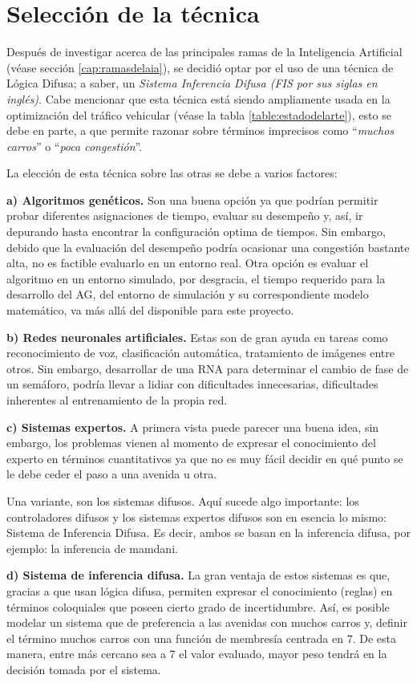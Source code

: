 \section{Selección de la técnica}\label{section:selecciontecnica}
Después de investigar acerca de las principales ramas de la Inteligencia Artificial (véase sección \ref{cap:ramasdelaia}), se decidió optar por el uso de una técnica de Lógica Difusa; a saber, un \emph{Sistema Inferencia Difusa (FIS por sus siglas en inglés)}. Cabe mencionar que esta técnica está siendo ampliamente usada en la optimización del tráfico vehicular (véase la tabla \ref{table:estadodelarte}), esto se debe en parte, a que permite razonar sobre términos imprecisos como ``\emph{muchos carros}'' o ``\emph{poca congestión}''.

La elección de esta técnica sobre las otras se debe a varios factores: 

\textbf{a) Algoritmos genéticos.} Son una buena opción ya que podrían permitir probar diferentes asignaciones de tiempo, evaluar su desempeño y, así, ir depurando hasta encontrar la configuración optima de tiempos. Sin embargo, debido que la evaluación del desempeño podría ocasionar una congestión bastante alta, no es factible evaluarlo en un entorno real. Otra opción es evaluar el algoritmo en un entorno simulado, por desgracia, el tiempo requerido para la desarrollo del AG, del entorno de simulación y su correspondiente modelo matemático, va más allá del disponible para este proyecto.

\textbf{b) Redes neuronales artificiales.} Estas son de gran ayuda en tareas como reconocimiento de voz, clasificación automática, tratamiento de imágenes entre otros. Sin embargo, desarrollar de una RNA para determinar el cambio de fase de un semáforo, podría llevar a lidiar con dificultades innecesarias, dificultades inherentes al entrenamiento de la propia red.

\textbf{c) Sistemas expertos.} A primera vista puede parecer una buena idea, sin embargo, los problemas vienen al momento de expresar el conocimiento del experto en términos cuantitativos ya que no es muy fácil decidir en qué punto se le debe ceder el paso a una avenida u otra.

Una variante, son los sistemas difusos. Aquí sucede algo importante: los controladores difusos y los sistemas expertos difusos son en esencia lo mismo: Sistema de Inferencia Difusa. Es decir, ambos se basan en la inferencia difusa, por ejemplo: la inferencia de mamdani.

\textbf{d) Sistema de inferencia difusa.} La gran ventaja de estos sistemas es que, gracias a que usan lógica difusa, permiten expresar el conocimiento (reglas) en términos coloquiales que poseen cierto grado de incertidumbre. Así, es posible modelar un sistema que de preferencia a las avenidas con muchos carros y, definir el término muchos carros con una función de membresía centrada en 7. De esta manera, entre más cercano sea a 7 el valor evaluado, mayor peso tendrá en la decisión tomada por el sistema.

